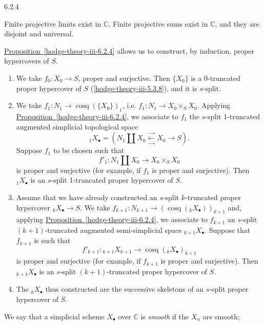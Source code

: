 \begin{proposition}{6.2.4}
    \label{hodge-theory-iii-6.2.4.1}\par{}Finite projective limits exist in \(\mathbb {C}\).
        Finite projective sums exist in \(\mathbb {C}\), and they are disjoint and universal.\end{proposition}\label{hodge-theory-iii-6.2.5}\par{}\hyperref[hodge-theory-iii-6.2.4]{Proposition~\ref*{hodge-theory-iii-6.2.4}} allows us to construct, by induction, proper hypercovers of \(S\).\begin{enumerate}
    
 \item[(0)]
      We take \(f_0\colon  X_0\to  S\), proper and surjective.
      Then \(\{X_0\}\) is a \(0\)-truncated proper hypercover of \(S\) (\cref{hodge-theory-iii-5.3.8}), and it is \(s\)-split.
    


    
 \item[(1)]
      We take \(f_1\colon  N_1\to \operatorname {cosq}(\{X_0\})_1\), i.e. \(f_1\colon  N_1\to  X_0\times _S X_0\).
      Applying \hyperref[hodge-theory-iii-6.2.4]{Proposition~\ref*{hodge-theory-iii-6.2.4}}, we associate to \(f_1\) the \(s\)-split 1-truncated augmented simplicial topological space
      \[         {}_1X_\bullet          = \left (         N_1{\textstyle \coprod } X_0         \xleftarrow [\to ]{\to } X_0         \to  S         \right ).       \]
      Suppose \(f_1\) to be chosen such that
      \[         f'_1         \colon  N_1{\textstyle \coprod } X_0\to  X_0\times _S X_0       \]
      is proper and surjective (for example, if \(f_1\) is proper and surjective).
      Then \({}_1X_\bullet \) is an \(s\)-split 1-truncated proper hypercover of \(S\).
    


    
 \item[(k+1)]
      Assume that we have already constructed an \(s\)-split \(k\)-truncated proper hypercover \({}_kX_\bullet \to  S\).
      We take \(f_{k+1}\colon  N_{k+1}\to (\operatorname {cosq}({}_kX_\bullet ))_{k+1}\) and, applying \hyperref[hodge-theory-iii-6.2.4]{Proposition~\ref*{hodge-theory-iii-6.2.4}}, we associate to \(f_{k+1}\) an \(s\)-split \((k+1)\)-truncated augmented semi-simplicial space \({}_{k+1}X_\bullet \).
      Suppose that \(f_{k+1}\) is such that
      \[         f'_{k+1}         \colon  {}_{k+1}X_{k+1}         \to  \operatorname {cosq}({}_kX_\bullet )_{k+1}       \]
      is proper and surjective (for example, if \(f_{k+1}\) is proper and surjective).
      Then \({}_{k+1}X_\bullet \) is an \(s\)-split \((k+1)\)-truncated proper hypercover of \(S\).
    


    
 \item[(∞)]
      The \({}_kX_\bullet \) thus constructed are the successive skeletons of an \(s\)-split proper hypercover of \(S\).
    

  \end{enumerate}\label{hodge-theory-iii-6.2.6}\par{}We say that a simplicial scheme \(X_\bullet \) over \(\mathbb {C}\) is \emph{smooth} if the \(X_n\) are smooth;
